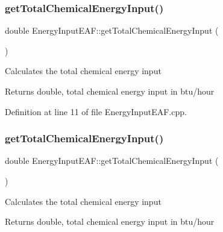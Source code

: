 \subsubsection{\texorpdfstring{get\+Total\+Chemical\+Energy\+Input()}{getTotalChemicalEnergyInput()}\hspace{0.1cm}{\footnotesize\ttfamily [1/3]}}
{\footnotesize\ttfamily double Energy\+Input\+E\+A\+F\+::get\+Total\+Chemical\+Energy\+Input (\begin{DoxyParamCaption}{ }\end{DoxyParamCaption})}

Calculates the total chemical energy input

\begin{DoxyReturn}{Returns}
double, total chemical energy input in btu/hour 
\end{DoxyReturn}


Definition at line 11 of file Energy\+Input\+E\+A\+F.\+cpp.

\mbox{\label{class_energy_input_e_a_f_a44b4a70dcc3e5f0bf9d33eabd6158b2f}} 
\subsubsection{\texorpdfstring{get\+Total\+Chemical\+Energy\+Input()}{getTotalChemicalEnergyInput()}\hspace{0.1cm}{\footnotesize\ttfamily [2/3]}}
{\footnotesize\ttfamily double Energy\+Input\+E\+A\+F\+::get\+Total\+Chemical\+Energy\+Input (\begin{DoxyParamCaption}{ }\end{DoxyParamCaption})}

Calculates the total chemical energy input

\begin{DoxyReturn}{Returns}
double, total chemical energy input in btu/hour 
\end{DoxyReturn}
\mbox{\label{class_energy_input_e_a_f_a44b4a70dcc3e5f0bf9d33eabd6158b2f}} 
